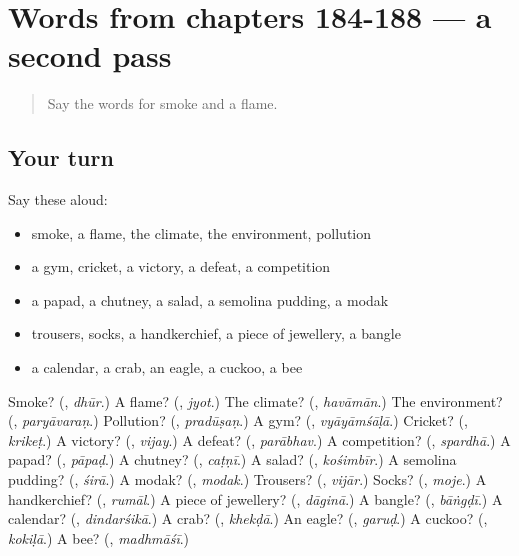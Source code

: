 \section[(dialogue)]{Words from chapters 184-188 — a second pass}

\label{lesson:MR-R188-second-pass-words-from-chapters-184-188}



\begin{quote}
Say the words for smoke and a flame.
\end{quote}

\subsection*{Your turn}
Say these aloud:

\begin{itemize}
\raggedright
  \item smoke, a flame, the climate, the environment, pollution
  \item a gym, cricket, a victory, a defeat, a competition
  \item a papad, a chutney, a salad, a semolina pudding, a modak
  \item trousers, socks, a handkerchief, a piece of jewellery, a bangle
  \item a calendar, a crab, an eagle, a cuckoo, a bee
\end{itemize}

\begin{tcolorbox}[breakable,colback=teal!4,colframe=teal!35!black,title={Before you move on}]
Smoke? (\textbf{}, \emph{dhūr}.) A flame? (\textbf{}, \emph{jyot}.) The climate? (\textbf{}, \emph{havāmān}.) The environment? (\textbf{}, \emph{paryāvaraṇ}.) Pollution? (\textbf{}, \emph{pradūṣaṇ}.) A gym? (\textbf{}, \emph{vyāyāmśāḷā}.) Cricket? (\textbf{}, \emph{krikeṭ}.) A victory? (\textbf{}, \emph{vijay}.) A defeat? (\textbf{}, \emph{parābhav}.) A competition? (\textbf{}, \emph{spardhā}.) A papad? (\textbf{}, \emph{pāpaḍ}.) A chutney? (\textbf{}, \emph{caṭṇī}.) A salad? (\textbf{}, \emph{kośimbīr}.) A semolina pudding? (\textbf{}, \emph{śirā}.) A modak? (\textbf{}, \emph{modak}.) Trousers? (\textbf{}, \emph{vijār}.) Socks? (\textbf{}, \emph{moje}.) A handkerchief? (\textbf{}, \emph{rumāl}.) A piece of jewellery? (\textbf{}, \emph{dāginā}.) A bangle? (\textbf{}, \emph{bāṅgḍī}.) A calendar? (\textbf{}, \emph{dindarśikā}.) A crab? (\textbf{}, \emph{khekḍā}.) An eagle? (\textbf{}, \emph{garuḍ}.) A cuckoo? (\textbf{}, \emph{kokiḷā}.) A bee? (\textbf{}, \emph{madhmāśī}.)
\end{tcolorbox}
